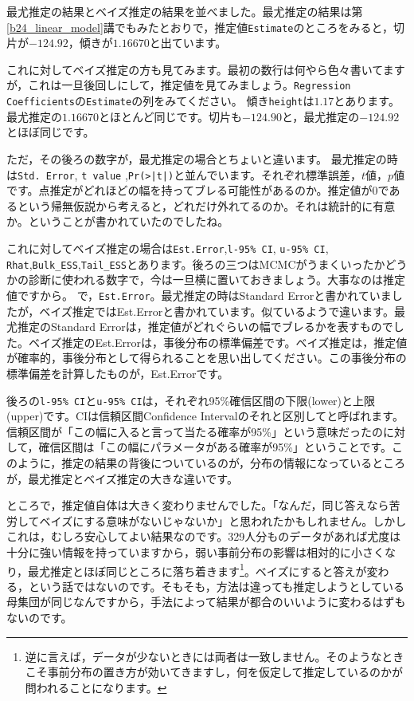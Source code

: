 \documentclass{ltjbook}
\begin{document}
最尤推定の結果とベイズ推定の結果を並べました。最尤推定の結果は第\ref{b24_linear_model}講でもみたとおりで，推定値\verb|Estimate|のところをみると，切片が$-124.92$，傾きが$1.16670$と出ています。

これに対してベイズ推定の方も見てみます。最初の数行は何やら色々書いてますが，これは一旦後回しにして，推定値を見てみましょう。\verb|Regression Coefficients|の\verb|Estimate|の列をみてください。
傾き\texttt{height}は$1.17$とあります。最尤推定の$1.16670$とほとんど同じです。切片も$-124.90$と，最尤推定の$-124.92$とほぼ同じです。

ただ，その後ろの数字が，最尤推定の場合とちょいと違います。
最尤推定の時は\verb|Std. Error|, \verb|t value| ,\verb+Pr(>|t|)+と並んでいます。それぞれ標準誤差，$t$値，$p$値です。点推定がどれほどの幅を持ってブレる可能性があるのか。推定値が0であるという帰無仮説から考えると，どれだけ外れてるのか。それは統計的に有意か。ということが書かれていたのでしたね。

これに対してベイズ推定の場合は\verb|Est.Error|,\verb|l-95% CI|, \verb|u-95% CI|, \verb|Rhat|,\verb|Bulk_ESS|,\verb|Tail_ESS|とあります。後ろの三つはMCMCがうまくいったかどうかの診断に使われる数字で，今は一旦横に置いておきましょう。大事なのは推定値ですから。
で，\verb|Est.Error|。最尤推定の時はStandard Errorと書かれていましたが，ベイズ推定ではEst.Errorと書かれています。似ているようで違います。最尤推定のStandard Errorは，推定値がどれぐらいの幅でブレるかを表すものでした。ベイズ推定のEst.Errorは，事後分布の標準偏差です。ベイズ推定は，推定値が確率的，事後分布として得られることを思い出してください。この事後分布の標準偏差を計算したものが，Est.Errorです。

後ろの\verb|l-95% CI|と\verb|u-95% CI|は，それぞれ95\%確信区間の下限(lower)と上限(upper)です。CIは信頼区間Confidence Intervalのそれと区別してと呼ばれます。信頼区間が「この幅に入ると言って当たる確率が95\%」という意味だったのに対して，確信区間は「この幅にパラメータがある確率が95\%」ということです。このように，推定の結果の背後についているのが，分布の情報になっているところが，最尤推定とベイズ推定の大きな違いです。

ところで，推定値自体は大きく変わりませんでした。「なんだ，同じ答えなら苦労してベイズにする意味がないじゃないか」と思われたかもしれません。しかしこれは，むしろ安心してよい結果なのです。329人分ものデータがあれば尤度は十分に強い情報を持っていますから，弱い事前分布の影響は相対的に小さくなり，最尤推定とほぼ同じところに落ち着きます\footnote{逆に言えば，データが少ないときには両者は一致しません。そのようなときこそ事前分布の置き方が効いてきますし，何を仮定して推定しているのかが問われることになります。}。ベイズにすると答えが変わる，という話ではないのです。そもそも，方法は違っても推定しようとしている母集団が同じなんですから，手法によって結果が都合のいいように変わるはずもないのです。
\end{document}
